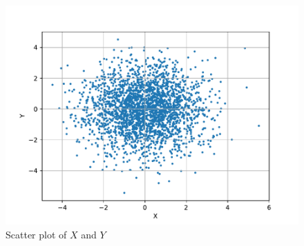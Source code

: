 \documentclass[journal,8pt,onecolumn]{IEEEtran}
\begin{document}
\begin{enumerate}
\begin{enumerate}[label=(\alph{enumii})]
\begin{figure}[H]
\centering
\includegraphics[width=\columnwidth/2]{./figs/zero_corr_verify.pdf}
\caption{Scatter plot of $X$ and $Y$}
\label{fig:zero_corr_scatter}
\end{figure}


\end{enumerate}
\end{enumerate}
\end{document}
